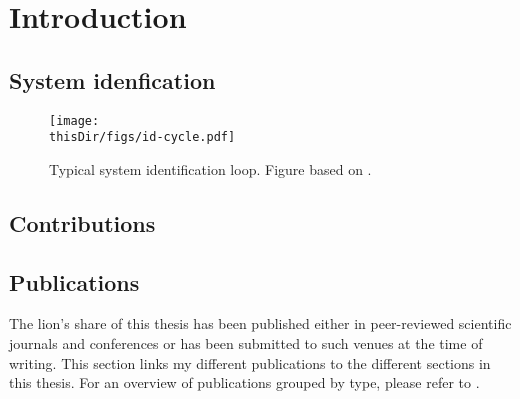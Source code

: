 \chapter{Introduction}
\def\thisDir{ch01-intro}

  \section{System idenfication}

\begin{figure}

  \centering
  \texttt{[image: \\thisDir/figs/id-cycle.pdf]}
  \caption[Identification loop]{Typical system identification loop. Figure based on \citep[Figure 1.10]{Ljung1999}.}
  \label{fig:intro:identification-cycle}
\end{figure}

   \section{Contributions}

   \section{Publications}
   The lion's share of this thesis has been published either in peer-reviewed scientific journals and conferences or has been submitted to such venues at the time of writing.
   This section links my different publications to the different sections in this thesis.
   For an overview of publications grouped by type, please refer to \pageref{publicationList}.

